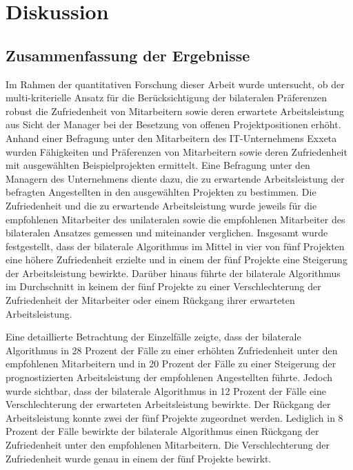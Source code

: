 
\chapter{Diskussion}
\label{ch:diskussion}

\section{Zusammenfassung der Ergebnisse}
Im Rahmen der quantitativen Forschung dieser Arbeit wurde untersucht, ob der multi-kriterielle Ansatz für die Berücksichtigung der bilateralen Präferenzen robust die Zufriedenheit von Mitarbeitern sowie deren erwartete Arbeitsleistung aus Sicht der Manager bei der Besetzung von offenen Projektpositionen erhöht.
Anhand einer Befragung unter den Mitarbeitern des IT-Unternehmens Exxeta wurden Fähigkeiten und Präferenzen von Mitarbeitern sowie deren Zufriedenheit mit ausgewählten Beispielprojekten ermittelt.
Eine Befragung unter den Managern des Unternehmens diente dazu, die zu erwartende Arbeitsleistung der befragten Angestellten in den ausgewählten Projekten zu bestimmen.
Die Zufriedenheit und die zu erwartende Arbeitsleistung wurde jeweils für die empfohlenen Mitarbeiter des unilateralen sowie die empfohlenen Mitarbeiter des bilateralen Ansatzes gemessen und miteinander verglichen.
Insgesamt wurde festgestellt, dass der bilaterale Algorithmus im Mittel in vier von fünf Projekten eine höhere Zufriedenheit erzielte und in einem der fünf Projekte eine Steigerung der Arbeitsleistung bewirkte.
Darüber hinaus führte der bilaterale Algorithmus im Durchschnitt in keinem der fünf Projekte zu einer Verschlechterung der Zufriedenheit der Mitarbeiter oder einem Rückgang ihrer erwarteten Arbeitsleistung.

Eine detaillierte Betrachtung der Einzelfälle zeigte, dass der bilaterale Algorithmus in 28 Prozent der Fälle zu einer erhöhten Zufriedenheit unter den empfohlenen Mitarbeitern und in 20 Prozent der Fälle zu einer Steigerung der prognostizierten Arbeitsleistung der empfohlenen Angestellten führte.
Jedoch wurde sichtbar, dass der bilaterale Algorithmus in 12 Prozent der Fälle eine Verschlechterung der erwarteten Arbeitsleistung bewirkte.
Der Rückgang der Arbeitsleistung konnte zwei der fünf Projekte zugeordnet werden.
Lediglich in 8 Prozent der Fälle bewirkte der bilaterale Algorithmus einen Rückgang der Zufriedenheit unter den empfohlenen Mitarbeitern.
Die Verschlechterung der Zufriedenheit wurde genau in einem der fünf Projekte bewirkt.

